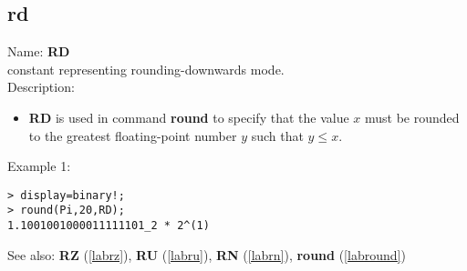 \subsection{rd}
\label{labrd}
\noindent Name: \textbf{RD}\\
constant representing rounding-downwards mode.\\
\noindent Description: \begin{itemize}

\item \textbf{RD} is used in command \textbf{round} to specify that the value $x$ must be rounded
   to the greatest floating-point number $y$ such that $y \le x$.
\end{itemize}
\noindent Example 1: 
\begin{center}\begin{minipage}{15cm}\begin{Verbatim}[frame=single]
> display=binary!;
> round(Pi,20,RD);
1.1001001000011111101_2 * 2^(1)
\end{Verbatim}
\end{minipage}\end{center}
See also: \textbf{RZ} (\ref{labrz}), \textbf{RU} (\ref{labru}), \textbf{RN} (\ref{labrn}), \textbf{round} (\ref{labround})
